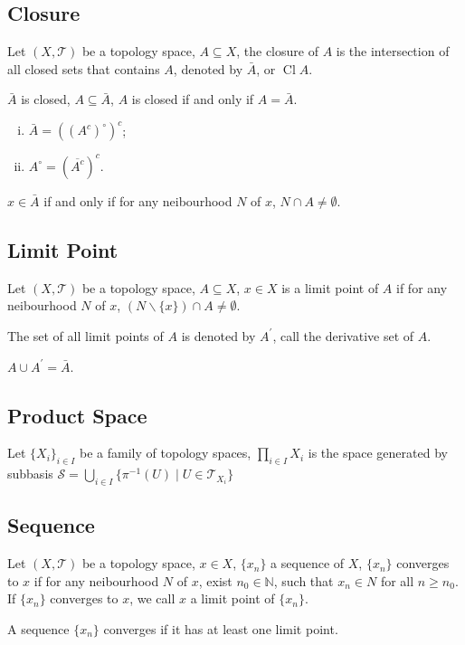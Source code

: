 \subsection{Closure}
\begin{defi}
Let $(X, \mathcal{T})$ be a topology space, $A \subseteq X$,
the closure of $A$ is the intersection of all closed sets that contains $A$,
denoted by $\bar A$, or $\mathop{\mathrm{Cl}} A$.
\end{defi}
$\bar A$ is closed, $A \subseteq \bar A$, $A$ is closed if and only if $A = \bar A$.
\begin{pro}
\begin{enumerate}[i).]
\item $\bar A = ((A^c)^\circ)^c$;
\item $A^\circ = (\overline{A^c})^c$.
\end{enumerate}
\end{pro}
\begin{pro}
$x \in \bar A$ if and only if for any neibourhood $N$ of $x$, $N \cap A \neq \emptyset$.
\end{pro}


\subsection{Limit Point}
\begin{defi}
Let $(X, \mathcal{T})$ be a topology space, $A \subseteq X$,
$x \in X$ is a limit point of $A$ if for any neibourhood $N$ of $x$,
$(N \backslash \{x\}) \cap A \neq \emptyset$.
\end{defi}
The set of all limit points of $A$ is denoted by $A^\prime$,
call the derivative set of $A$.
\begin{pro}
$A \cup A^\prime = \bar A$.
\end{pro}


\subsection{Product Space}
\begin{defi}
Let $\{X_i\}_{i \in I}$ be a family of topology spaces,
$\prod_{i \in I} X_i$ is the space generated by subbasis
$\mathcal{S} = \bigcup_{i \in I} \{\pi^{-1}(U) \mid U \in \mathcal{T}_{X_i}\}$
\end{defi}


\subsection{Sequence}
\begin{defi}
Let $(X, \mathcal{T})$ be a topology space, $x \in X$,
$\{x_n\}$ a sequence of $X$, $\{x_n\}$ converges to $x$
if for any neibourhood $N$ of $x$, exist $n_0 \in \mathbb{N}$,
such that $x_n \in N$ for all $n \geq n_0$.
If $\{x_n\}$ converges to $x$, we call $x$ a limit point of $\{x_n\}$.
\end{defi}
\begin{defi}
A sequence $\{x_n\}$ converges if it has at least one limit point.
\end{defi}
\begin{pro}
\end{pro}


